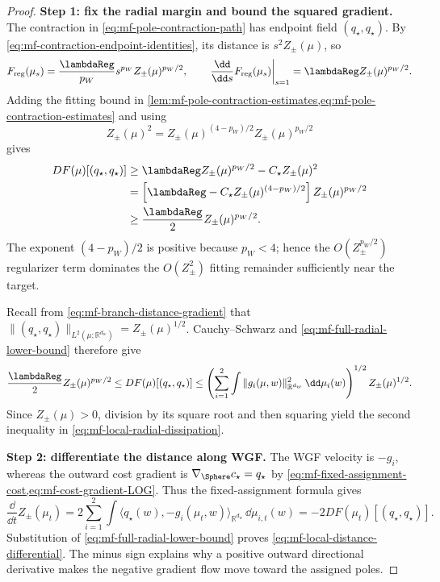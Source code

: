 \begin{proof}
\noindent\textbf{Step 1: fix the radial margin and bound the squared gradient.}
The contraction in \cref{eq:mf-pole-contraction-path} has endpoint field
\((q_\star,q_\star)\). By
\cref{eq:mf-contraction-endpoint-identities}, its distance is
\(s^2Z_\pm(\mu)\), so
\[
 F_{\mathrm{reg}}(\mu_s)
 =\frac{\lambdaReg}{p_W}s^{p_W}Z_\pm(\mu)^{p_W/2},
 \qquad
 \left.\frac{\dd}{\dd s}F_{\mathrm{reg}}(\mu_s)\right|_{s=1}
 =\lambdaReg Z_\pm(\mu)^{p_W/2}.
\]
Adding the fitting bound in
\cref{lem:mf-pole-contraction-estimates,eq:mf-pole-contraction-estimates}
and using
\[
Z_\pm(\mu)^2
 =Z_\pm(\mu)^{(4-p_W)/2}Z_\pm(\mu)^{p_W/2}
\]
gives
\begin{align}
 DF(\mu)[(q_\star,q_\star)]
 &\ge \lambdaReg Z_\pm(\mu)^{p_W/2}-C_\star Z_\pm(\mu)^2\notag\\
 &=\left[\lambdaReg-C_\star Z_\pm(\mu)^{(4-p_W)/2}\right]
                  Z_\pm(\mu)^{p_W/2}\notag\\
 &\ge\frac{\lambdaReg}{2}Z_\pm(\mu)^{p_W/2}.
 \label{eq:mf-full-radial-lower-bound}
\end{align}
The exponent \((4-p_W)/2\) is positive because \(p_W<4\); hence the
\(O(Z_\pm^{p_W/2})\) regularizer term dominates the
\(O(Z_\pm^2)\) fitting remainder sufficiently near the target.

Recall from \cref{eq:mf-branch-distance-gradient} that
\(\|(q_\star,q_\star)\|_{L^2(\mu;\mathbb R^{d_w})}
=Z_\pm(\mu)^{1/2}\). Cauchy--Schwarz and
\cref{eq:mf-full-radial-lower-bound} therefore give
\[
 \frac{\lambdaReg}{2}Z_\pm(\mu)^{p_W/2}
 \le DF(\mu)[(q_\star,q_\star)]
 \le
 \left(\sum_{i=1}^2\int
       \|g_i(\mu,w)\|_{\mathbb R^{d_w}}^2\,\dd\mu_i(w)\right)^{1/2}
 Z_\pm(\mu)^{1/2}.
\]
Since \(Z_\pm(\mu)>0\), division by its square root and then squaring yield
the second inequality in \cref{eq:mf-local-radial-dissipation}.

\par\noindent\textbf{Step 2: differentiate the distance along WGF.}
The WGF velocity is \(-g_i\), whereas the outward cost gradient is
\(\nabla_\Sphere c_\star=q_\star\) by
\cref{eq:mf-fixed-assignment-cost,eq:mf-cost-gradient-LOG}. Thus the
fixed-assignment formula gives
\[
 \frac{\dd}{\dd t}Z_\pm(\mu_t)
 =2\sum_{i=1}^2\int
   \langle q_\star(w),-g_i(\mu_t,w)\rangle_{\mathbb R^{d_w}}
   \,\dd\mu_{i,t}(w)
 =-2DF(\mu_t)[(q_\star,q_\star)].
\]
Substitution of \cref{eq:mf-full-radial-lower-bound} proves
\cref{eq:mf-local-distance-differential}. The minus sign explains why a
positive outward directional derivative makes the negative gradient flow
move toward the assigned poles.


\end{proof}
